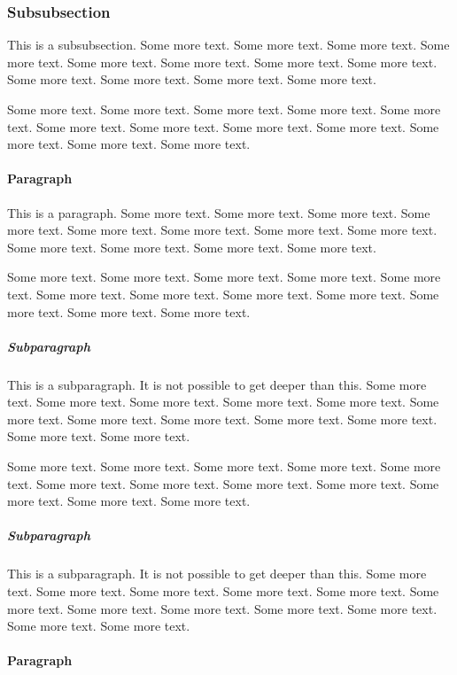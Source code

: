 \subsubsection{Subsubsection}

This is a subsubsection. Some more text. Some more text. Some more text. Some more text. Some more text. Some more text. Some more text. Some more text. Some more text. Some more text. Some more text. Some more text. 

Some more text. Some more text. Some more text. Some more text. Some more text. Some more text. Some more text. Some more text. Some more text. Some more text. Some more text. Some more text. 

\paragraph{Paragraph}

This is a paragraph. Some more text. Some more text. Some more text. Some more text. Some more text. Some more text. Some more text. Some more text. Some more text. Some more text. Some more text. Some more text.  

Some more text. Some more text. Some more text. Some more text. Some more text. Some more text. Some more text. Some more text. Some more text. Some more text. Some more text. Some more text. 

\subparagraph{Subparagraph}

This is a subparagraph. It is not possible to get deeper than this. Some more text. Some more text. Some more text. Some more text. Some more text. Some more text. Some more text. Some more text. Some more text. Some more text. Some more text. Some more text. 

Some more text. Some more text. Some more text. Some more text. Some more text. Some more text. Some more text. Some more text. Some more text. Some more text. Some more text. Some more text. 

\subparagraph{Subparagraph}

This is a subparagraph. It is not possible to get deeper than this. Some more text. Some more text. Some more text. Some more text. Some more text. Some more text. Some more text. Some more text. Some more text. Some more text. Some more text. Some more text. 

\paragraph{Paragraph}

